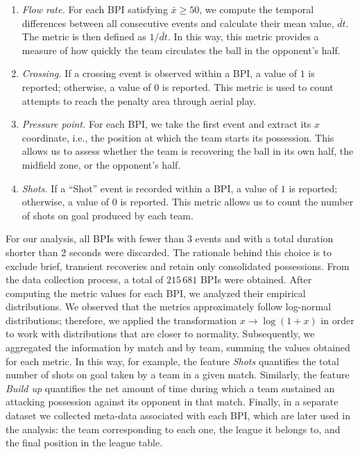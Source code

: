 \documentclass[preprint, amsmath,amssymb, pre]{revtex4-2}
\begin{document}
\begin{enumerate}
    \item {\it Flow rate.} For each BPI satisfying $\bar{x}\geq50$, we compute the temporal differences between all consecutive events and calculate their mean value, $\bar{dt}$. The metric is then defined as $1/\bar{dt}$. In this way, this metric provides a measure of how quickly the team circulates the ball in the opponent’s half.

    \item {\it Crossing.} If a crossing event is observed within a BPI, a value of $1$ is reported; otherwise, a value of $0$ is reported. This metric is used to count attempts to reach the penalty area through aerial play.

    \item {\it Pressure point.} For each BPI, we take the first event and extract its $x$ coordinate, i.e., the position at which the team starts its possession. This allows us to assess whether the team is recovering the ball in its own half, the midfield zone, or the opponent’s half.
 
    \item {\it Shots.} If a ``Shot'' event is recorded within a BPI, a value of $1$ is reported; otherwise, a value of $0$ is reported. This metric allows us to count the number of shots on goal produced by each team.
    
\end{enumerate}

For our analysis, all BPIs with fewer than 3 events and with a total duration shorter than 2 seconds were discarded. The rationale behind this choice is to exclude brief, transient recoveries and retain only consolidated possessions.  
From the data collection process, a total of $215\,681$ BPIs were obtained.
%
After computing the metric values for each BPI, we analyzed their empirical distributions. We observed that the metrics approximately follow log-normal distributions; therefore, we applied the transformation $x \rightarrow \log(1+x)$ in order to work with distributions that are closer to normality.  
%
Subsequently, we aggregated the information by match and by team, summing the values obtained for each metric. In this way, for example, the feature {\it Shots} quantifies the total number of shots on goal taken by a team in a given match.  
Similarly, the feature {\it Build up} quantifies the net amount of time during which a team sustained an attacking possession against its opponent in that match.
%
Finally, in a separate dataset we collected meta-data associated with each BPI, which are later used in the analysis: the team corresponding to each one, the league it belongs to, and the final position in the league table.
\end{document}
